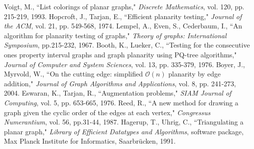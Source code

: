 \documentclass[letterpaper, 12pt]{amsart}
\theoremstyle{definition}
\theoremstyle{definition}
\theoremstyle{thm}
\theoremstyle{definition}
\begin{document}
\begin{thebibliography}{21}
	Voigt, M., ``List colorings of planar graphs,"
	\textit{Discrete Mathematics}, vol. 120, pp. 215-219, 1993.
	Hopcroft, J., Tarjan, E., ``Efficient planarity testing," \textit{Journal of
	the ACM}, vol. 21, pp. 549-568, 1974.
	Lempel, A., Even, S., Cederbaum, I., ``An algorithm for planarity testing of
	graphs," \textit{Theory of graphs: International Symposium}, pp.215-232,
	1967.
	Booth, K., Lueker, C., ``Testing for the consecutive ones property interval
	graphs and graph planarity using PQ-tree algorithms," \textit{Journal of
	Computer and System Sciences}, vol. 13, pp. 335-379, 1976.
	Boyer, J., Myrvold, W., ``On the cutting edge: simplified $\mathcal{O}(n)$ planarity by
	edge addition," \textit{Journal of Graph Algorithms and Applications}, vol.
	8, pp. 241-273, 2004.
	Eswaran, K., Tarjan, R., ``Augmentation problems," \textit{SIAM Journal of
	Computing}, vol. 5, pp. 653-665, 1976.
	Reed, R., ``A new method for drawing a graph given the cyclic order of the
	edges at each vertex," \textit{Congressus Numerantium}, vol. 56, pp.31-44,
	1987.
	Hagerup, T., Uhrig, C., ``Triangulating a planar graph," \textit{Library of
	Efficient Datatypes and Algorithms}, software package, Max Planck Institute
	for Informatics, Saarbr{\"u}cken, 1991.
\end{thebibliography}
\end{document}
